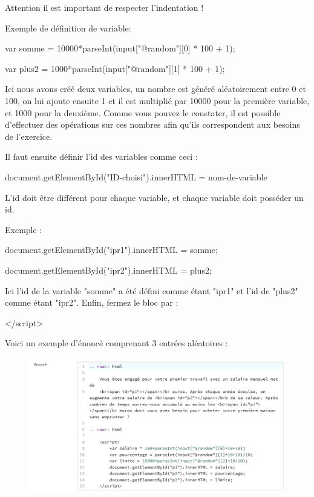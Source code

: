 \documentclass{article}
\begin{document}
Attention il est important de respecter l'indentation !

\bigskip

Exemple de définition de variable:
\bigskip

\hspace{2cm}var somme = 10000*parseInt(input["@random"][0] * 100 + 1);

\hspace{2cm}var plus2 = 1000*parseInt(input["@random"][1] * 100 + 1);
\bigskip

Ici nous avons créé deux variables, un nombre est généré aléatoirement entre 0 et 100, on lui ajoute ensuite 1 et il est multiplié par 10000 pour la première variable, et 1000 pour la deuxième. Comme vous pouvez le constater, il est possible d'effectuer des opérations sur ces nombres afin qu'ils correspondent aux besoins de l'exercice.

\bigskip
Il faut ensuite définir l'id des variables comme ceci :
\bigskip

\hspace{2cm}document.getElementById("ID-choisi").innerHTML = nom-de-variable
\bigskip

L'id doit être différent pour chaque variable, et chaque variable doit posséder un id.

Exemple :
\bigskip

\hspace{2cm}document.getElementById("ipr1").innerHTML = somme;

\hspace{2cm}document.getElementById("ipr2").innerHTML = plus2;
\bigskip

Ici l'id de la variable "somme" a été défini comme étant "ipr1" et l'id de "plus2" comme étant "ipr2". Enfin, fermez le bloc par :
\bigskip

\hspace{1cm}</script>

\bigskip
Voici un exemple d'énoncé comprenant 3 entrées aléatoires :

\begin{figure}[!htb]
    \centering
    \includegraphics[scale=0.6]{images/random.png}
\end{figure}
\end{document}
